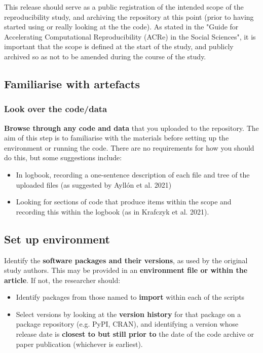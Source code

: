 This release should serve as a public registration of the intended scope of the reproducibility study, and archiving the repository at this point (prior to having started using or really looking at the the code). As stated in the "Guide for Accelerating Computational Reproducibility (ACRe) in the Social Sciences", it is important that the scope is defined at the start of the study, and publicly archived so as not to be amended during the course of the study.\cite{berkeley_initiative_for_transparency_in_the_social_sciences_guide_2022}

\vspace{0.5cm}
\subsection{Familiarise with artefacts}

\subsubsection{Look over the code/data}

\textbf{Browse through any code and data} that you uploaded to the repository. The aim of this step is to familiarise with the materials before setting up the environment or running the code. There are no requirements for how you should do this, but some suggestions include:
\begin{itemize}
    \item In logbook, recording a one-sentence description of each file and tree of the uploaded files (as suggested by Ayllón et al. 2021\autocite{ayllon_keeping_2021})
    \item Looking for sections of code that produce items within the scope and recording this within the logbook (as in Krafczyk et al. 2021\cite{krafczyk_learning_2021}).
\end{itemize}

\vspace{0.5cm}
\subsection{Set up environment}

Identify the \textbf{software packages and their versions}, as used by the original study authors. This may be provided in an \textbf{environment file or within the article}. If not, the researcher should:
\begin{itemize}
    \item Identify packages from those named to \textbf{import} within each of the scripts
    \item Select versions by looking at the \textbf{version history} for that package on a package repository (e.g. PyPI, CRAN), and identifying a version whose release date is \textbf{closest to but still prior to} the date of the code archive or paper publication (whichever is earliest).
\end{itemize}


